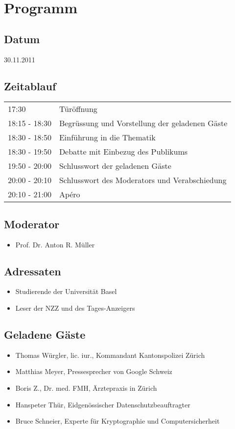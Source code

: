 \section{Programm}
\subsection*{Datum}
30.11.2011

\subsection*{Zeitablauf}
\begin{tabular}{ll}
17:30	& Türöffnung\\
18:15 - 18:30 & Begrüssung und Vorstellung der geladenen Gäste \\
18:30 - 18:50 & Einführung in die Thematik \\
18:30 - 19:50 & Debatte mit Einbezug des Publikums\\
19:50 - 20:00 & Schlusswort der geladenen Gäste\\
20:00 - 20:10 & Schlusswort des Moderators und Verabschiedung\\
20:10 - 21:00 & Apéro\\
\end{tabular}

\subsection*{Moderator}
\begin{itemize}
 \item Prof. Dr. Anton R. Müller
\end{itemize}

\subsection*{Adressaten}
\begin{itemize}
 \item Studierende der Universität Basel
 \item Leser der NZZ und des Tages-Anzeigers
\end{itemize}


\subsection*{Geladene Gäste}
\begin{itemize}
\item Thomas Würgler, lic. iur., Kommandant Kantonspolizei Zürich
\item Matthias Meyer, Pressesprecher von Google Schweiz
\item Boris Z., Dr. med. FMH, Ärztepraxis in Zürich
\item Hanspeter Thür, Eidgenössischer Datenschutzbeauftragter
\item Bruce Schneier, Experte für Kryptographie und Computersicherheit
\end{itemize}

